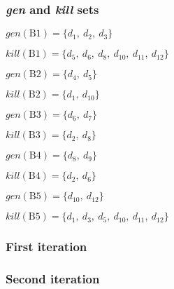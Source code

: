 \subsubsection{\emph{gen} and \emph{kill} sets}

$gen(\text{B1}) = \{d_1,~d_2,~d_3\}$

$kill(\text{B1}) = \{d_5, ~d_6, ~d_8, ~d_{10}, ~d_{11}, ~d_{12}\}$

$gen(\text{B2}) = \{d_4,~d_5\}$

$kill(\text{B2}) = \{d_1,~ d_{10}\}$

$gen(\text{B3}) = \{d_6,~ d_7\}$

$kill(\text{B3}) = \{d_2,~ d_8\}$

$gen(\text{B4}) = \{d_8,~ d_9\}$

$kill(\text{B4}) = \{d_2,~ d_6\}$

$gen(\text{B5}) = \{d_{10},~ d_{12}\}$

$kill(\text{B5}) = \{d_1,~ d_3,~ d_5,~ d_{10},~ d_{11},~ d_{12}\}$

\subsubsection{First iteration}
\newcommand{\INBone}	{$\emptyset$}
\newcommand{\OUTBone}	{$\{d_{1},~ d_2,~ d_3\}$}
\newcommand{\INBtwo}	{\OUTBone}
\newcommand{\OUTBtwo}	{$\{d_2,~ d_3,~ d_4,~ d_5\}$}
\newcommand{\INBthree}	{\OUTBtwo}
\newcommand{\OUTBthree}	{$\{d_3,~ d_4,~ d_5,~ d_6,~ d_7\}$}
\newcommand{\INBfour}	{\OUTBtwo}
\newcommand{\OUTBfour}	{$\{d_3,~ d_4,~ d_5,~ d_8,~ d_9\}$}
\newcommand{\INBfive}	{$\{d_3,~ d_4,~ d_5,~ d_6,~ d_7,~ d_8,~ d_9\}$}
\newcommand{\OUTBfive}	{$\{d_1,~ d_4,~ d_6,~ d_7,~ d_8,~ d_9,~ d_{10},~ d_{12}\}$}



\subsubsection{Second iteration}
\renewcommand{\INBone}		{$\{d_1,~ d_4,~ d_6,~ d_7,~ d_8,~ d_9,~ d_{10},~ d_{12}\}$}
\renewcommand{\OUTBone}		{$\{d_1,~ d_2,~ d_3,~ d_4,~ d_7,~ d_9\}$}
\renewcommand{\INBtwo}		{\OUTBone}
\renewcommand{\OUTBtwo}		{$\{d_2,~ d_3,~ d_4,~ d_5,~ d_7,~ d_9\}$}
\renewcommand{\INBthree}	{\OUTBtwo}
\renewcommand{\OUTBthree}	{$\{d_3,~ d_4,~ d_5,~ d_6,~ d_7,~ d_9\}$}
\renewcommand{\INBfour}		{\OUTBtwo}
\renewcommand{\OUTBfour}	{$\{d_3,~ d_4,~ d_5,~ d_7,~ d_8,~ d_9\}$}
\renewcommand{\INBfive}		{$\{d_3,~ d_4,~ d_5,~ d_6,~ d_7,~ d_8,~ d_9\}$}
\renewcommand{\OUTBfive}	{$\{d_4,~ d_6,~ d_7,~ d_8,~ d_9,~ d_{10},~ d_{12}\}$}

